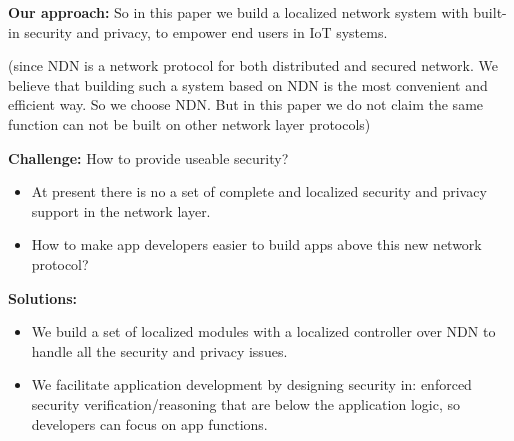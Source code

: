 \textbf{Our approach:}
So in this paper we build a localized network system with built-in security and privacy, to empower end users in IoT systems.

(since NDN is a network protocol for both distributed and secured network. We believe that building such a system based on NDN is the most convenient and efficient way. So we choose NDN. But in this paper we do not claim the same function can not be built on other network layer protocols)

\textbf{Challenge:} How to provide useable security?
\begin{itemize}
	\item At present there is no a set of complete and localized security and privacy support in the network layer.
	\item How to make app developers easier to build apps above this new network protocol?
\end{itemize}

\textbf{Solutions:}
\begin{itemize}
	\item We build a set of localized modules with a localized controller over NDN to handle all the security and privacy issues.
	\item We facilitate application development by designing security in: enforced security verification/reasoning that are below the application logic, so developers can focus on app functions.
\end{itemize}
